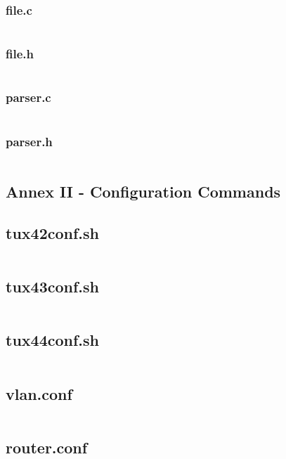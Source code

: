 \documentclass[11pt]{article}
\begin{document}
\subsubsection*{file.c}

\inputminted{c}{file.c}

\newpage

\subsubsection*{file.h}

\inputminted{c}{file.h}

\newpage

\subsubsection*{parser.c}

\inputminted{c}{parser.c}

\newpage

\subsubsection*{parser.h}

\inputminted{c}{parser.h}

\newpage


\subsection*{Annex II - Configuration Commands}


\subsection*{tux42conf.sh}

\inputminted{bash}{tux42conf.sh}

\newpage

\subsection*{tux43conf.sh}

\inputminted{bash}{tux43conf.sh}

\newpage

\subsection*{tux44conf.sh}

\inputminted{bash}{tux44conf.sh}

\newpage

\subsection*{vlan.conf}

\inputminted{text}{vlan.conf}

\newpage

\subsection*{router.conf}

\inputminted{text}{router.conf}

\newpage
\end{document}
